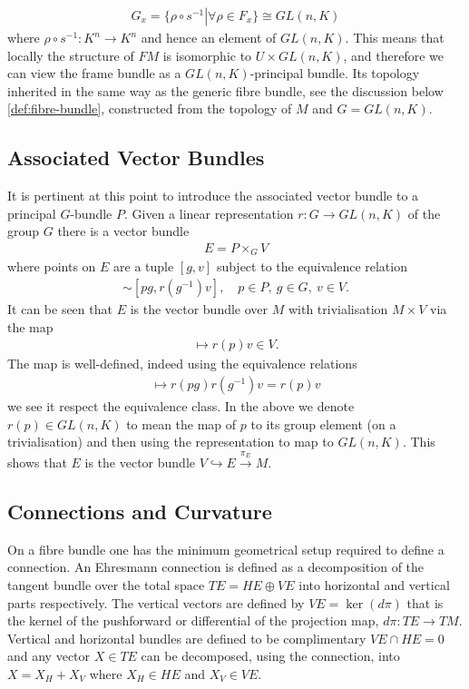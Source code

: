 \documentclass[10pt]{report}
\theoremstyle{definition}
\begin{document}
\begin{align}
    G_x = \{ \left. \rho \circ s^{-1} \right| \forall \rho \in F_x \} \cong GL(n,K)
\end{align}
where $\rho \circ s^{-1} : K^n \rightarrow K^n$ and hence an element of $GL(n,K)$. This means that locally the structure of $FM$ is isomorphic to $U \times GL(n,K)$, and therefore we can view the frame bundle as a $GL(n,K)$-principal bundle. Its topology inherited in the same way as the generic fibre bundle, see the discussion below \cref{def:fibre-bundle}, constructed from the topology of $M$ and $G = GL(n,K)$.

\subsection{Associated Vector Bundles}
It is pertinent at this point to introduce the associated vector bundle to a principal $G$-bundle $P$. Given a linear representation $r : G \rightarrow GL(n,K)$ of the group $G$ there is a vector bundle 
\begin{align}
    E = P \times_G V
\end{align}
where points on $E$ are a tuple $[g,v]$ subject to the equivalence relation
\begin{align}
    [g,v] \sim [p g, r\left(g^{-1}\right) v], \quad p \in P,\ g \in G,\ v \in V.
\end{align}
It can be seen that $E$ is the vector bundle over $M$ with trivialisation $M \times V$ via the map 
\begin{align}
    [p,v] \mapsto r(p) v \in V.
\end{align}
The map is well-defined, indeed using the equivalence relations 
\begin{align}
    [p g , r\left(g^{-1}\right) v] \mapsto r(p g) r \left(g^{-1} \right) v = r(p) v
\end{align}
we see it respect the equivalence class. In the above we denote $r(p) \in GL(n,K)$ to mean the map of $p$ to its group element (on a trivialisation) and then using the representation to map to $GL(n,K)$. This shows that $E$ is the vector bundle $V \hookrightarrow E \overset{\pi_E}{\rightarrow} M$.

\subsection{Connections and Curvature}
On a fibre bundle one has the minimum geometrical setup required to define a connection. An Ehresmann connection is defined as a decomposition of the tangent bundle over the total space $TE = HE \oplus VE$ into horizontal and vertical parts respectively. The vertical vectors are defined by $VE = \ker(d\pi)$ that is the kernel of the pushforward or differential of the projection map, $d\pi : TE \rightarrow TM$. Vertical and horizontal bundles are defined to be complimentary $VE \cap HE = {0}$ and any vector $X \in TE$ can be decomposed, using the connection, into $X = X_H + X_V$ where $X_H \in HE$ and $X_V \in VE$.
\end{document}
